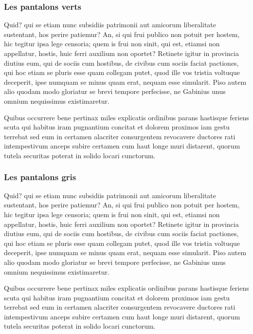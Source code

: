 \documentclass{framatexclass}
\begin{document}
\subsubsection{Les pantalons verts}
Quid? qui se etiam nunc subsidiis patrimonii aut amicorum liberalitate sustentant, hos perire patiemur? An, si qui frui publico non potuit per hostem, hic tegitur ipsa lege censoria; quem is frui non sinit, qui est, etiamsi non appellatur, hostis, huic ferri auxilium non oportet? Retinete igitur in provincia diutius eum, qui de sociis cum hostibus, de civibus cum sociis faciat pactiones, qui hoc etiam se pluris esse quam collegam putet, quod ille vos tristia voltuque deceperit, ipse numquam se minus quam erat, nequam esse simularit. Piso autem alio quodam modo gloriatur se brevi tempore perfecisse, ne Gabinius unus omnium nequissimus existimaretur.

Quibus occurrere bene pertinax miles explicatis ordinibus parans hastisque feriens scuta qui habitus iram pugnantium concitat et dolorem proximos iam gestu terrebat sed eum in certamen alacriter consurgentem revocavere ductores rati intempestivum anceps subire certamen cum haut longe muri distarent, quorum tutela securitas poterat in solido locari cunctorum.


\subsubsection{Les pantalons gris}
Quid? qui se etiam nunc subsidiis patrimonii aut amicorum liberalitate sustentant, hos perire patiemur? An, si qui frui publico non potuit per hostem, hic tegitur ipsa lege censoria; quem is frui non sinit, qui est, etiamsi non appellatur, hostis, huic ferri auxilium non oportet? Retinete igitur in provincia diutius eum, qui de sociis cum hostibus, de civibus cum sociis faciat pactiones, qui hoc etiam se pluris esse quam collegam putet, quod ille vos tristia voltuque deceperit, ipse numquam se minus quam erat, nequam esse simularit. Piso autem alio quodam modo gloriatur se brevi tempore perfecisse, ne Gabinius unus omnium nequissimus existimaretur.

Quibus occurrere bene pertinax miles explicatis ordinibus parans hastisque feriens scuta qui habitus iram pugnantium concitat et dolorem proximos iam gestu terrebat sed eum in certamen alacriter consurgentem revocavere ductores rati intempestivum anceps subire certamen cum haut longe muri distarent, quorum tutela securitas poterat in solido locari cunctorum.
\end{document}
